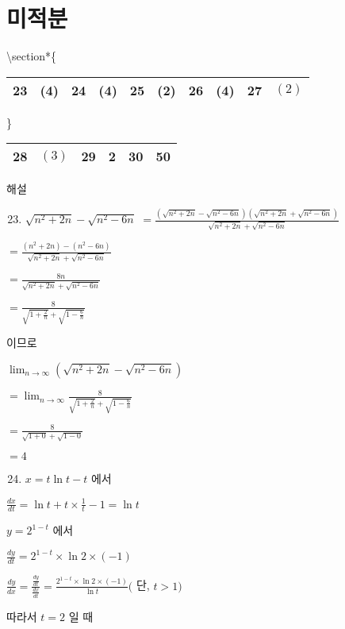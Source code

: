 \documentclass[10pt]{article}
\begin{document}
\section*{미적분}
\textbackslash section*\{\begin{tabular}{|l|l|l|l|l|l|l|l|l|l|}
\hline
23 & (4) & 24 & (4) & 25 & (2) & 26 & (4) & 27 & \((2)\) \\
\hline
\end{tabular}\} \begin{tabular}{l|l|l|l|l|l|}
\hline
28 & \((3)\) & 29 & 2 & 30 & 50 \\
\hline
\end{tabular}

해설

\begin{enumerate}
  \setcounter{enumi}{22}
  \item \(\sqrt{n^{2}+2 n}-\sqrt{n^{2}-6 n}\) \(=\frac{\left(\sqrt{n^{2}+2 n}-\sqrt{n^{2}-6 n}\right)\left(\sqrt{n^{2}+2 n}+\sqrt{n^{2}-6 n}\right)}{\sqrt{n^{2}+2 n}+\sqrt{n^{2}-6 n}}\)
\end{enumerate}

\(=\frac{\left(n^{2}+2 n\right)-\left(n^{2}-6 n\right)}{\sqrt{n^{2}+2 n}+\sqrt{n^{2}-6 n}}\)

\(=\frac{8 n}{\sqrt{n^{2}+2 n}+\sqrt{n^{2}-6 n}}\)

\(=\frac{8}{\sqrt{1+\frac{2}{n}}+\sqrt{1-\frac{6}{n}}}\)

이므로

\(\lim _{n \rightarrow \infty}\left(\sqrt{n^{2}+2 n}-\sqrt{n^{2}-6 n}\right)\)

\(=\lim _{n \rightarrow \infty} \frac{8}{\sqrt{1+\frac{2}{n}}+\sqrt{1-\frac{6}{n}}}\)

\(=\frac{8}{\sqrt{1+0}+\sqrt{1-0}}\)

\(=4\)

\begin{enumerate}
  \setcounter{enumi}{23}
  \item \(x=t \ln t-t\) 에서
\end{enumerate}

\(\frac{d x}{d t}=\ln t+t \times \frac{1}{t}-1=\ln t\)

\(y=2^{1-t}\) 에서

\(\frac{d y}{d t}=2^{1-t} \times \ln 2 \times(-1)\)

\(\frac{d y}{d x}=\frac{\frac{d y}{d t}}{\frac{d x}{d t}}=\frac{2^{1-t} \times \ln 2 \times(-1)}{\ln t}(\) 단, \(t>1)\)

따라서 \(t=2\) 일 때
\end{document}
